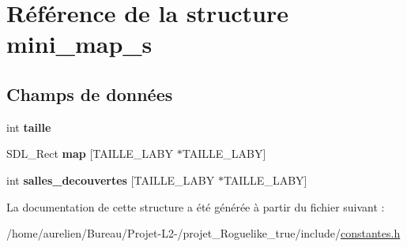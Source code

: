 \hypertarget{structmini__map__s}{}\section{Référence de la structure mini\+\_\+map\+\_\+s}
\label{structmini__map__s}
\subsection*{Champs de données}
\begin{DoxyCompactItemize}
\item 
\mbox{\label{structmini__map__s_a35fe00063637a1173bab82172326f9cc}} 
int {\bfseries taille}
\item 
\mbox{\label{structmini__map__s_a49f769a0774e9c6d548050a98a08680d}} 
S\+D\+L\+\_\+\+Rect {\bfseries map} \mbox{[}T\+A\+I\+L\+L\+E\+\_\+\+L\+A\+BY $\ast$T\+A\+I\+L\+L\+E\+\_\+\+L\+A\+BY\mbox{]}
\item 
\mbox{\label{structmini__map__s_a8f43a2e32b841d52ca9d60d8b3060667}} 
int {\bfseries salles\+\_\+decouvertes} \mbox{[}T\+A\+I\+L\+L\+E\+\_\+\+L\+A\+BY $\ast$T\+A\+I\+L\+L\+E\+\_\+\+L\+A\+BY\mbox{]}
\end{DoxyCompactItemize}


La documentation de cette structure a été générée à partir du fichier suivant \+:\begin{DoxyCompactItemize}
\item 
/home/aurelien/\+Bureau/\+Projet-\/\+L2-\//projet\+\_\+\+Roguelike\+\_\+true/include/\hyperlink{constantes_8h}{constantes.\+h}\end{DoxyCompactItemize}
